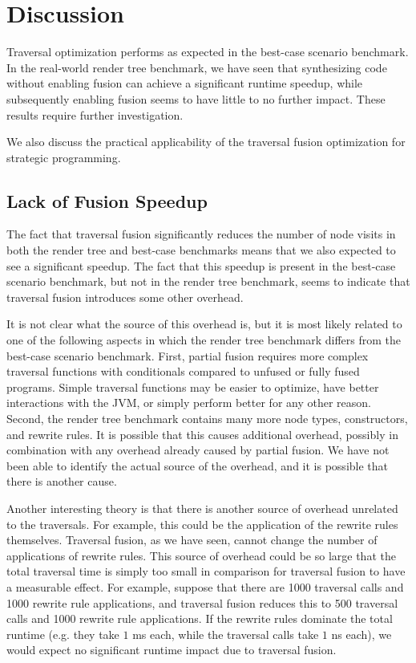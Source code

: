 \section{Discussion}
\label{sec:bm-discussion}
Traversal optimization performs as expected in the best-case scenario benchmark. In the real-world render tree benchmark, we have seen that synthesizing code without enabling fusion can achieve a significant runtime speedup, while subsequently enabling fusion seems to have little to no further impact. These results require further investigation.

We also discuss the practical applicability of the traversal fusion optimization for strategic programming.

\subsection{Lack of Fusion Speedup}
The fact that traversal fusion significantly reduces the number of node visits in both the render tree and best-case benchmarks means that we also expected to see a significant speedup. The fact that this speedup is present in the best-case scenario benchmark, but not in the render tree benchmark, seems to indicate that traversal fusion introduces some other overhead.

It is not clear what the source of this overhead is, but it is most likely related to one of the following aspects in which the render tree benchmark differs from the best-case scenario benchmark. First, partial fusion requires more complex traversal functions with conditionals compared to unfused or fully fused programs. Simple traversal functions may be easier to optimize, have better interactions with the JVM, or simply perform better for any other reason. Second, the render tree benchmark contains many more node types, constructors, and rewrite rules. It is possible that this causes additional overhead, possibly in combination with any overhead already caused by partial fusion. We have not been able to identify the actual source of the overhead, and it is possible that there is another cause.

Another interesting theory is that there is another source of overhead unrelated to the traversals. For example, this could be the application of the rewrite rules themselves. Traversal fusion, as we have seen, cannot change the number of applications of rewrite rules. This source of overhead could be so large that the total traversal time is simply too small in comparison for traversal fusion to have a measurable effect. For example, suppose that there are 1000 traversal calls and 1000 rewrite rule applications, and traversal fusion reduces this to 500 traversal calls and 1000 rewrite rule applications. If the rewrite rules dominate the total runtime (e.g. they take $1$ ms each, while the traversal calls take $1$ ns each), we would expect no significant runtime impact due to traversal fusion.

